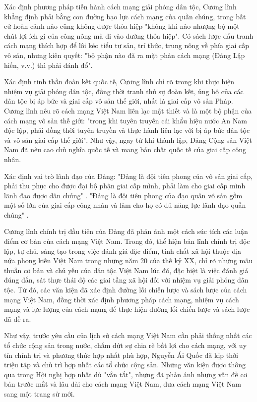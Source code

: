 Xác định phương pháp tiến hành cách mạng giải phóng dân tộc, Cương lĩnh khẳng định phải bằng con đường bạo lực cách mạng của quần chúng, trong bất cứ hoàn cảnh nào cũng không được thỏa hiệp "không khi nào nhượng bộ một chút lợi ích gì của công nông mà đi vào đường thỏa hiệp". Có sách lược đấu tranh cách mạng thích hợp để lôi kéo tiểu tư sản, trí thức, trung nông về phía giai cấp vô sản, nhưng kiên quyết: "bộ phận nào đã ra mặt phản cách mạng (Đảng Lập hiến, v.v.) thì phải đánh đổ".

Xác định tinh thần đoàn kết quốc tế, Cương lĩnh chỉ rõ trong khi thực hiện nhiệm vụ giải phóng dân tộc, đồng thời tranh thủ sự đoàn kết, ủng hộ của các dân tộc bị áp bức và giai cấp vô sản thế giới, nhất là giai cấp vô sản Pháp. Cương lĩnh nêu rõ cách mạng Việt Nam liên lạc mật thiết và là một bộ phận của cách mạng vô sản thế giới: "trong khi tuyên truyền cái khẩu hiệu nước An Nam độc lập, phải đồng thời tuyên truyền và thực hành liên lạc với bị áp bức dân tộc và vô sản giai cấp thế giới". Như vậy, ngay từ khi thành lập, Đảng Cộng sản Việt Nam đã nêu cao chủ nghĩa quốc tế và mang bản chất quốc tế của giai cấp công nhân.

Xác định vai trò lãnh đạo của Đảng: "Đảng là đội tiên phong của vô sản giai cấp, phải thu phục cho được đại bộ phận giai cấp mình, phải làm cho giai cấp mình lãnh đạo được dân chúng" . "Đảng là đội tiên phong của đạo quân vô sản gồm một số lớn của giai cấp công nhân và làm cho họ có đủ năng lực lãnh đạo quần chúng" .

Cương lĩnh chính trị đầu tiên của Đảng đã phản ánh một cách súc tích các luận điểm cơ bản của cách mạng Việt Nam. Trong đó, thể hiện bản lĩnh chính trị độc lập, tự chủ, sáng tạo trong việc đánh giá đặc điểm, tính chất xã hội thuộc địa nửa phong kiến Việt Nam trong những năm 20 của thế kỷ XX, chỉ rõ những mâu thuẫn cơ bản và chủ yếu của dân tộc Việt Nam lúc đó, đặc biệt là việc đánh giá đúng đắn, sát thực thái độ các giai tầng xã hội đối với nhiệm vụ giải phóng dân tộc. Từ đó, các văn kiện đã xác định đường lối chiến lược và sách lược của cách mạng Việt Nam, đồng thời xác định phương pháp cách mạng, nhiệm vụ cách mạng và lực lượng của cách mạng để thực hiện đường lối chiến lược và sách lược đã đề ra.

Như vậy, trước yêu cầu của lịch sử cách mạng Việt Nam cần phải thống nhất các tổ chức cộng sản trong nước, chấm dứt sự chia rẽ bất lợi cho cách mạng, với uy tín chính trị và phương thức hợp nhất phù hợp, Nguyễn Ái Quốc đã kịp thời triệu tập và chủ trì hợp nhất các tổ chức cộng sản. Những văn kiện được thông qua trong Hội nghị hợp nhất dù "vắn tắt", nhưng đã phản ánh những vấn đề cơ bản trước mắt và lâu dài cho cách mạng Việt Nam, đưa cách mạng Việt Nam sang một trang sử mới.